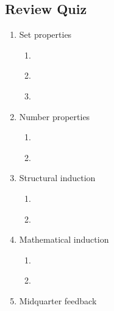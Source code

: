 \subsection*{Review Quiz}
\begin{enumerate}
\item Set properties
\begin{enumerate}
    \item \hspace{1in}\\ 
    \item \hspace{1in}\\ 
    \item \hspace{1in}\\ 
\end{enumerate}
\item Number properties\begin{enumerate}
    \item \hspace{1in}\\ 
    \item \hspace{1in}\\ 
\end{enumerate}
\item Structural induction
\begin{enumerate}
    \item 
    \item \hspace{1in}\\ 
\end{enumerate}
\item Mathematical induction
\begin{enumerate}
    \item \hspace{1in}\\ 
    \item \hspace{1in}\\ 
\end{enumerate}
\item Midquarter feedback
\end{enumerate}


\newpage
